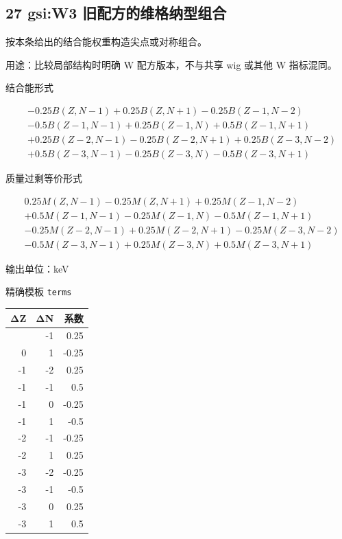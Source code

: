 \documentclass[
  11pt,
  letterpaper,
]{article}
\begin{document}
\subsection{27 gsi:W3
旧配方的维格纳型组合}\label{gsiw3-ux65e7ux914dux65b9ux7684ux7ef4ux683cux7eb3ux578bux7ec4ux5408}

按本条给出的结合能权重构造尖点或对称组合。

用途：比较局部结构时明确 W 配方版本，不与共享 wig 或其他 W 指标混同。

结合能形式

\[
\begin{aligned}
& -0.25B(Z,N-1)+0.25B(Z,N+1)-0.25B(Z-1,N-2) \\
& -0.5B(Z-1,N-1)+0.25B(Z-1,N)+0.5B(Z-1,N+1) \\
& +0.25B(Z-2,N-1)-0.25B(Z-2,N+1)+0.25B(Z-3,N-2) \\
& +0.5B(Z-3,N-1)-0.25B(Z-3,N)-0.5B(Z-3,N+1)
\end{aligned}
\]

质量过剩等价形式

\[
\begin{aligned}
& 0.25M(Z,N-1)-0.25M(Z,N+1)+0.25M(Z-1,N-2) \\
& +0.5M(Z-1,N-1)-0.25M(Z-1,N)-0.5M(Z-1,N+1) \\
& -0.25M(Z-2,N-1)+0.25M(Z-2,N+1)-0.25M(Z-3,N-2) \\
& -0.5M(Z-3,N-1)+0.25M(Z-3,N)+0.5M(Z-3,N+1)
\end{aligned}
\]

输出单位：keV

精确模板 \texttt{terms}

\begin{longtable}[]{@{}rrr@{}}
\toprule\noalign{}
ΔZ & ΔN & 系数 \\
\midrule\noalign{}
\endhead
\bottomrule\noalign{}
\endlastfoot
0 & -1 & 0.25 \\
0 & 1 & -0.25 \\
-1 & -2 & 0.25 \\
-1 & -1 & 0.5 \\
-1 & 0 & -0.25 \\
-1 & 1 & -0.5 \\
-2 & -1 & -0.25 \\
-2 & 1 & 0.25 \\
-3 & -2 & -0.25 \\
-3 & -1 & -0.5 \\
-3 & 0 & 0.25 \\
-3 & 1 & 0.5 \\
\end{longtable}
\end{document}
